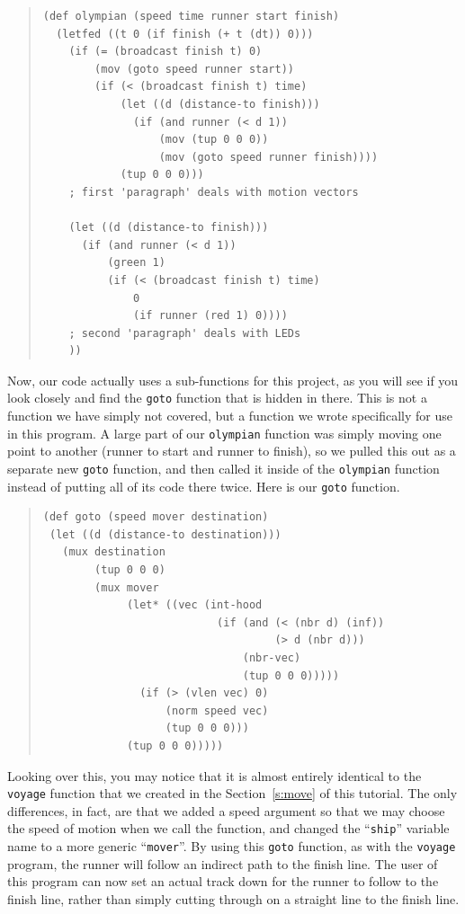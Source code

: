 \documentclass{article}
\newcommand\var[1]{{\tt #1}}
\newcommand\qvar[1]{``{\tt #1}''}
\begin{document}
\begin{quote}
\begin{verbatim}
(def olympian (speed time runner start finish) 
  (letfed ((t 0 (if finish (+ t (dt)) 0))) 
    (if (= (broadcast finish t) 0) 
        (mov (goto speed runner start)) 
        (if (< (broadcast finish t) time) 
            (let ((d (distance-to finish))) 
              (if (and runner (< d 1)) 
                  (mov (tup 0 0 0)) 
                  (mov (goto speed runner finish))))
            (tup 0 0 0)))
    ; first 'paragraph' deals with motion vectors

    (let ((d (distance-to finish))) 
      (if (and runner (< d 1)) 
          (green 1) 
          (if (< (broadcast finish t) time) 
              0
              (if runner (red 1) 0))))
    ; second 'paragraph' deals with LEDs
    ))
\end{verbatim}
\end{quote}

Now, our code actually uses a sub-functions for this project, as you
will see if you look closely and find the \var{goto} function that is
hidden in there.  This is not a function we have simply not covered,
but a function we wrote specifically for use in this program.  A large
part of our \var{olympian} function was simply moving one point to
another (runner to start and runner to finish), so we pulled this out
as a separate new \var{goto} function, and then called it inside of
the \var{olympian} function instead of putting all of its code there
twice.  Here is our \var{goto} function.

\begin{quote}
\begin{verbatim}
(def goto (speed mover destination)
 (let ((d (distance-to destination)))
   (mux destination
        (tup 0 0 0)
        (mux mover
             (let* ((vec (int-hood 
                           (if (and (< (nbr d) (inf)) 
                                    (> d (nbr d)))
                               (nbr-vec)
                               (tup 0 0 0)))))
               (if (> (vlen vec) 0) 
                   (norm speed vec)
                   (tup 0 0 0)))
             (tup 0 0 0)))))
\end{verbatim}
\end{quote}

Looking over this, you may notice that it is almost entirely identical
to the \var{voyage} function that we created in the
Section~\ref{s:move} of this tutorial.  The only differences, in fact,
are that we added a speed argument so that we may choose the speed of
motion when we call the function, and changed the \qvar{ship} variable
name to a more generic \qvar{mover}.  By using this \var{goto}
function, as with the \var{voyage} program, the runner will follow an
indirect path to the finish line.  The user of this program can now
set an actual track down for the runner to follow to the finish line,
rather than simply cutting through on a straight line to the finish
line.
\end{document}
